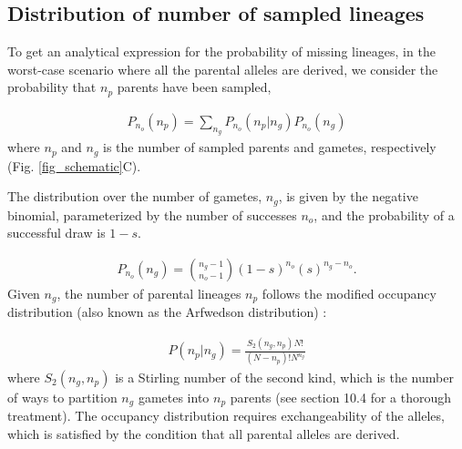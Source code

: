 \documentclass[review,nonatbib]{elsarticle}
\begin{document}

\subsection{Distribution of number of sampled lineages}
\label{subsec_distribution}

To get an analytical expression for the probability of missing lineages, in the worst-case scenario
where all the parental alleles are derived, we consider the probability that $n_p$ parents have been
sampled,

\begin{equation}
  \begin{aligned}
    \label{eq_conditional}
    P_{n_o}(n_p) = \sum_{n_g} P_{n_o}(n_p | n_g)P_{n_o}(n_g)
  \end{aligned}
\end{equation}
where $n_p$ and $n_g$ is the number of sampled parents and gametes, respectively (Fig.
\ref{fig_schematic}C).

The distribution over the number of gametes, $n_g$, is given by the negative binomial,
parameterized by the number of successes $n_o$, and the probability of a successful draw is $1-s$.

\begin{equation}
  \begin{aligned}
    \label{eq_neg_binomial_trials}
    P_{n_o}(n_g) = \binom{n_g-1}{n_o-1}(1-s)^{n_o}(s)^{n_g-n_o}.
  \end{aligned}
\end{equation}
Given $n_g$, the number of parental lineages $n_p$ follows the modified occupancy distribution
(also known as the Arfwedson distribution) \citep{Wakeley2009,ONeill2019,JohnsonEtAl2005}:

\begin{equation}
  \begin{aligned}
    \label{eq_occupancy}
    P(n_p|n_g) = \frac{S_2(n_g,n_p) N!}{(N-n_p)! N^{n_g}}
  \end{aligned}
\end{equation}
where $S_2(n_g,n_p)$ is a Stirling number of the second kind, which is the number of ways to
partition $n_g$ gametes into $n_p$ parents (see \cite{JohnsonEtAl2005} section 10.4 for a thorough
treatment).
The occupancy distribution requires exchangeability of the alleles, which is satisfied by the
condition that all parental alleles are derived.
\end{document}
